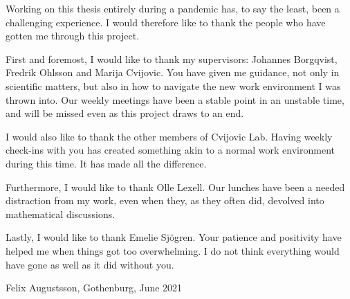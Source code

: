 
Working on this thesis entirely during a pandemic has, to say the least, been a challenging experience.
I would therefore like to thank the people who have gotten me through this project.

First and foremost, I would like to thank my supervisors: Johannes Borgqvist,
Fredrik Ohlsson and Marija Cvijovic.
You have given me guidance, not only in scientific matters, but also in how to navigate the new work environment I was thrown into.
Our weekly meetings have been a stable point in an unstable time, and will be missed even as this project draws to an end.

I would also like to thank the other members of Cvijovic Lab.
Having weekly check-ins with you has created something akin to a normal work environment during this time.
It has made all the difference.

Furthermore, I would like to thank Olle Lexell.
Our lunches have been a needed distraction from my work, even when they, as they often did, devolved into mathematical discussions.

Lastly, I would like to thank Emelie Sjögren.
Your patience and positivity have helped me when things got too overwhelming.
I do not think everything would have gone as well as it did without you.

\vspace{1.5cm}
\hfill
Felix Augustsson, Gothenburg, June 2021
